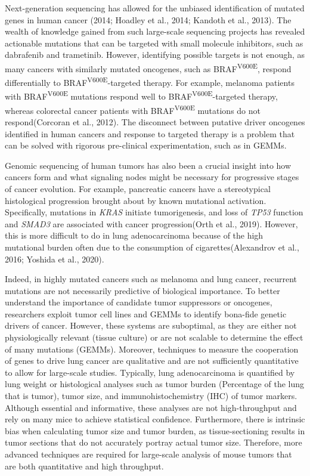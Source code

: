 Next-generation sequencing has allowed for the unbiased identification of mutated genes in human cancer (2014; Hoadley et al., 2014; Kandoth et al., 2013).
The wealth of knowledge gained from such large-scale sequencing projects has revealed actionable mutations that can be targeted with small molecule inhibitors, such as dabrafenib and trametinib.
However, identifying possible targets is not enough, as many cancers with similarly mutated oncogenes, such as BRAF\textsuperscript{V600E}, respond differentially to BRAF\textsuperscript{V600E}-targeted therapy.
For example, melanoma patients with BRAF\textsuperscript{V600E} mutations respond well to BRAF\textsuperscript{V600E}-targeted therapy, whereas colorectal cancer patients with BRAF\textsuperscript{V600E} mutations do not respond(Corcoran et al., 2012).
The disconnect between putative driver oncogenes identified in human cancers and response to targeted therapy is a problem that can be solved with rigorous pre-clinical experimentation, such as in GEMMs.

Genomic sequencing of human tumors has also been a crucial insight into how cancers form and what signaling nodes might be necessary for progressive stages of cancer evolution.
For example, pancreatic cancers have a stereotypical histological progression brought about by known mutational activation.
Specifically, mutations in \emph{KRAS} initiate tumorigenesis, and loss of \emph{TP53} function and \emph{SMAD3} are associated with cancer progression(Orth et al., 2019).
However, this is more difficult to do in lung adenocarcinoma because of the high mutational burden often due to the consumption of cigarettes(Alexandrov et al., 2016; Yoshida et al., 2020).

Indeed, in highly mutated cancers such as melanoma and lung cancer, recurrent mutations are not necessarily predictive of biological importance.
To better understand the importance of candidate tumor suppressors or oncogenes, researchers exploit tumor cell lines and GEMMs to identify bona-fide genetic drivers of cancer.
However, these systems are suboptimal, as they are either not physiologically relevant (tissue culture) or are not scalable to determine the effect of many mutations (GEMMs).
Moreover, techniques to measure the cooperation of genes to drive lung cancer are qualitative and are not sufficiently quantitative to allow for large-scale studies.
Typically, lung adenocarcinoma is quantified by lung weight or histological analyses such as tumor burden (Percentage of the lung that is tumor), tumor size, and immunohistochemistry (IHC) of tumor markers.
Although essential and informative, these analyses are not high-throughput and rely on many mice to achieve statistical confidence. Furthermore, there is intrinsic bias when calculating tumor size and tumor burden, as tissue-sectioning results in tumor sections that do not accurately portray actual tumor size. Therefore, more advanced techniques are required for large-scale analysis of mouse tumors that are both quantitative and high throughput.

